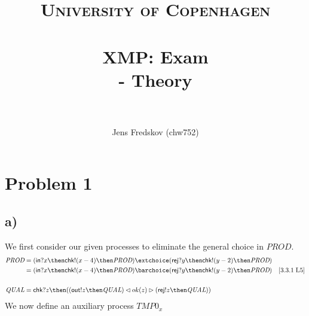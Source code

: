 \documentclass[a4paper, 11pt]{article}
\title{ 
\normalfont \normalsize 
\textsc{University of Copenhagen} \\ [25pt]
\horrule{0.5pt} \\[0.4cm]
\huge XMP: Exam \\ \Large - Theory \\
\horrule{2pt} \\[0.5cm]
}
\author{Jens Fredskov (chw752)}
\def\Prod{\textit{PROD}}
\def\Qual{\textit{QUAL}}
\def\inc{\textsf{in}}
\def\chk{\textsf{chk}}
\def\rej{\textsf{rej}}
\def\outc{\textsf{out}}
\newcommand{\law}[2]{[#1\;\text{#2}]}
\newcommand{\Tmp}[2]{\textit{TMP#1}_{#2}}
\begin{document}
\maketitle
\pagebreak

\section{Problem 1} %
\label{sec:problem_1}

\subsection{a)} %

We first consider our given processes to eliminate the general choice in $\Prod$.
\begin{align*}
    \Prod
    &= (\inc ? x \then \chk ! (x-4) \then \Prod) \extchoice
       (\rej ? y \then \chk ! (y-2) \then \Prod) \\
    &= (\inc ? x \then \chk ! (x-4) \then \Prod) \barchoice
       (\rej ? y \then \chk ! (y-2) \then \Prod) & \law{3.3.1}{L5} \\ \\
    \Qual
    &= \chk ? z \then ((\outc ! z \then \Qual) \lhd ok(z) \rhd
                       (\rej ! z \then \Qual))
\end{align*}
We now define an auxiliary process $\Tmp{0}{x}$
\end{document}
